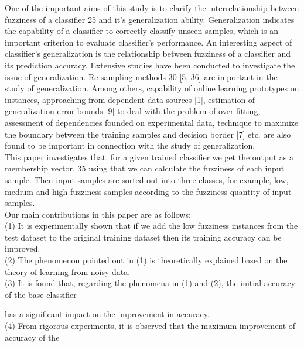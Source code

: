 \documentclass{article}
\begin{document}
	One of the important aims of this study is to clarify the interrelationship between fuzziness of a classifier 25
	and it’s generalization ability. Generalization indicates the capability of a classifier to correctly classify
	unseen samples, which is an important criterion to evaluate classifier’s performance. An interesting aspect
	of classifier’s generalization is the relationship between fuzziness of a classifier and its prediction accuracy.
	Extensive studies have been conducted to investigate the issue of generalization. Re-sampling methods
	30 [5, 36] \cite{ralescu1984probability, sowa2013source, kahraman2014supply, luhandjula1983linear} are important in the study of generalization. Among others, capability of online learning prototypes
	on instances, approaching from dependent data sources [1]\cite{slowinski2000scheduling}, estimation of generalization error bounds [9] \cite{saaty1982analytic} to
	deal with the problem of over-fitting, assessment of dependencies founded on experimental data, technique
	to maximize the boundary between the training samples and decision border [7] \cite{banai1993fuzziness, lerner1983fuzziness, delgado1998fuzziness} etc. are also found to be
	important in connection with the study of generalization.\\
	
	This paper investigates that, for a given trained classifier we get the output as a membership vector, 35
	using that we can calculate the fuzziness of each input sample. Then input samples are sorted out into three
	classes, for example, low, medium and high fuzziness samples according to the fuzziness quantity of input
	samples.\\
	
	Our main contributions in this paper are as follows:\\
	(1) It is experimentally shown that if we add the low fuzziness instances from the test dataset to 
	the original training dataset then its training accuracy can be improved.\\
	(2) The phenomenon pointed out in (1) is theoretically explained based on the theory of learning from noisy	data.\\
	(3) It is found that, regarding the phenomena in (1) and (2), the initial accuracy of the base classifier 
	
	has a
	significant impact on the improvement in accuracy.\\
	(4) From rigorous experiments, it is observed that the maximum improvement of accuracy of the 
	
\end{document}

